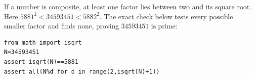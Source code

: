 If a number is composite, at least one factor lies between two and its square root. Here $ 5881^2<34593451<5882^2 $. The exact check below tests every possible smaller factor and finds none, proving $\boxed{34593451\text{ is prime}}$:
\begin{verbatim}
from math import isqrt
N=34593451
assert isqrt(N)==5881
assert all(N%d for d in range(2,isqrt(N)+1))
\end{verbatim}
